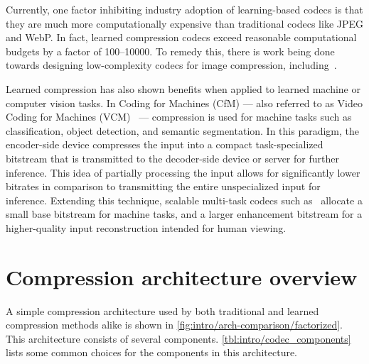 Currently, one factor inhibiting industry adoption of learning-based codecs is that they are much more computationally expensive than traditional codecs like JPEG and WebP.
In fact, learned compression codecs exceed reasonable computational budgets by a factor of 100--10000\texttimes{}.
To remedy this, there is work being done towards designing low-complexity codecs for image compression, including~\cite{galpin2023entropy,ladune2023coolchic,leguay2023lowcomplexity,kamisli2023lowcomplexity}.

Learned compression has also shown benefits when applied to learned machine or computer vision tasks.
In Coding for Machines (CfM) --- also referred to as Video Coding for Machines (VCM)~\cite{duan2020vcm} --- compression is used for machine tasks such as classification, object detection, and semantic segmentation.
In this paradigm, the encoder-side device compresses the input into a compact task-specialized bitstream that is transmitted to the decoder-side device or server for further inference.
This idea of partially processing the input allows for significantly lower bitrates in comparison to transmitting the entire unspecialized input for inference.
Extending this technique, scalable multi-task codecs such as~\cite{choi2021latentspace,choi2022sichm} allocate a small base bitstream for machine tasks, and a larger enhancement bitstream for a higher-quality input reconstruction intended for human viewing.




\section{Compression architecture overview}

A simple compression architecture used by both traditional and learned compression methods alike is shown in \cref{fig:intro/arch-comparison/factorized}.
This architecture consists of several components.
\cref{tbl:intro/codec_components} lists some common choices for the components in this architecture.

